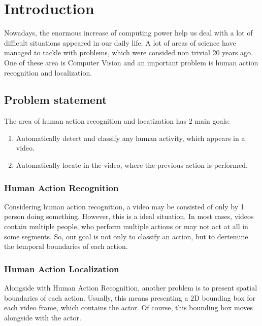 



% 

\chapter{Introduction}
Nowadays, the enormous increase of computing power help us deal with a lot of difficult situations appeared in our daily life.
A lot of areas of science have managed to tackle with problems, which were consided non trivial 20 years ago. One of
these area is Computer Vision and an important problem is human action recognition and localization.
\section{Problem statement}
The area of human action recognition and locatization has 2 main goals:
\begin{enumerate}
\item Automatically detect and classify any human activity, which appears in a video.
\item Automatically locate in the video, where the previous action is performed.
\end{enumerate}

\subsection{Human Action Recognition}
Considering human action recognition, a video may be consisted of only by 1 person doing something. However, this is a ideal
situation. In most cases, videos contain multiple people, who perform multiple actions or may not act at all in some segments.
So, our goal is not only to classify an action, but to dertemine the temporal boundaries of each action.
\subsection{Human Action Localization}
Alongside with Human Action Recognition, another problem is to present spatial boundaries of each action. Usually, this means
presenting a 2D bounding box for each video frame, which contains the actor. Of course, this bounding box moves alongside with
the actor.


